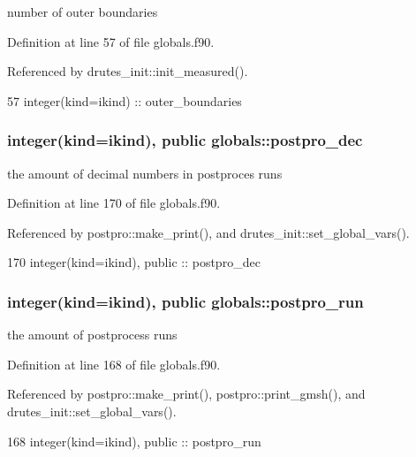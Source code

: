 number of outer boundaries 



Definition at line 57 of file globals.\+f90.



Referenced by drutes\+\_\+init\+::init\+\_\+measured().


\begin{DoxyCode}
57   \textcolor{keywordtype}{integer(kind=ikind)} :: outer_boundaries
\end{DoxyCode}
\subsubsection[{postpro\+\_\+dec}]{\setlength{\rightskip}{0pt plus 5cm}integer(kind=ikind), public globals\+::postpro\+\_\+dec}\label{namespaceglobals_ad684efaf7b03940e98e0a9b09aab7c3e}


the amount of decimal numbers in postproces runs 



Definition at line 170 of file globals.\+f90.



Referenced by postpro\+::make\+\_\+print(), and drutes\+\_\+init\+::set\+\_\+global\+\_\+vars().


\begin{DoxyCode}
170   \textcolor{keywordtype}{integer(kind=ikind)}, \textcolor{keywordtype}{public} :: postpro_dec
\end{DoxyCode}
\subsubsection[{postpro\+\_\+run}]{\setlength{\rightskip}{0pt plus 5cm}integer(kind=ikind), public globals\+::postpro\+\_\+run}\label{namespaceglobals_a1c3c76bd629062125abbfbccdafb6487}


the amount of postprocess runs 



Definition at line 168 of file globals.\+f90.



Referenced by postpro\+::make\+\_\+print(), postpro\+::print\+\_\+gmsh(), and drutes\+\_\+init\+::set\+\_\+global\+\_\+vars().


\begin{DoxyCode}
168   \textcolor{keywordtype}{integer(kind=ikind)}, \textcolor{keywordtype}{public} :: postpro_run
\end{DoxyCode}
